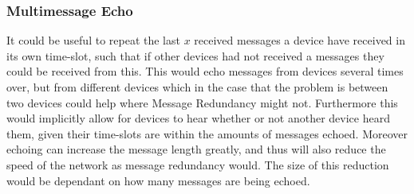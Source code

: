 \subsubsection*{Multimessage Echo}
It could be useful to repeat the last $x$ received messages a device have received in its own time-slot, such that if other devices had not received a messages they could be received from this.
This would echo messages from devices several times over, but from different devices which in the case that the problem is between two devices could help where Message Redundancy might not.  
Furthermore this would implicitly allow for devices to hear whether or not another device heard them, given their time-slots are within the amounts of messages echoed.
Moreover echoing can increase the message length greatly, and thus will also reduce the speed of the network as message redundancy would.
The size of this reduction would be dependant on how many messages are being echoed. 